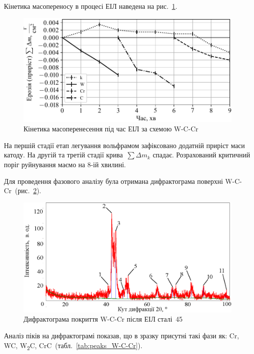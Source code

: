 \documentclass[a4paper,fontsize=14bp,ukrainian]{extreport}
\begin{document}
Кінетика масопереносу в процесі ЕІЛ наведена на рис.~\ref{fig:plt_gravi_W-C-Cr}.

\begin{figure}[H]
\centering \includegraphics[]{plt_gravi_W-C-Cr.pdf}
\caption{Кінетика масоперенесення під час ЕІЛ за схемою W-C-Cr}
\label{fig:plt_gravi_W-C-Cr}
\end{figure}

На першій стадії етап легування вольфрамом зафіксовано додатній приріст маси катоду. На другій та третій стадії крива~$\sum \Delta m_k$ спадає. Розрахований критичний поріг руйнування маємо на 8-ій хвилині.

Для проведення фазового аналізу була отримана дифрактограма поверхні W-C-Cr~(рис.~\ref{fig:peaks_W-C-Cr}).

\begin{figure}[H]
\centering
\includegraphics[width=\textwidth]{rigaku_peaks_W-C-Cr.ps}
\caption{Дифрактограма покриття W-C-Cr після ЕІЛ сталі~45}
\label{fig:peaks_W-C-Cr}
\end{figure}

Аналіз піків на дифрактограмі показав, що в зразку присутні такі фази як: Cr, WC, W\textsubscript{2}C, CrC~(табл.~\ref{tab:peaks_W-C-Cr}).
\end{document}
